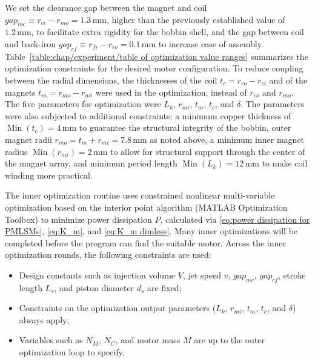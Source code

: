     
    We set the clearance gap between the magnet and coil $gap_{mc}\equiv r_{ci}-r_{mo} = 1.3\,\mathrm{mm}$, higher than the previously established value of $1.2\,\mathrm{mm}$,  to facilitate extra rigidity for the bobbin shell, and the gap between coil and back-iron $gap_{cf}\equiv r_{fi}-r_{co} = 0.1\,\mathrm{mm}$ to increase ease of assembly. Table~\ref{table:chap/experiment/table of optimization value ranges} summarizes the optimization constraints for the desired motor configuration. To reduce coupling between the radial dimensions, the thicknesses of the coil $t_c = r_{co} - r_{ci}$ and of the magnets $t_m = r_{mo} - r_{mi}$ were used in the optimization, instead of $r_{co}$ and $r_{mo}$. The five parameters for optimization were $L_k$, $r_{mi}$, $t_m$, $t_c$, and $\delta$. The parameters were also subjected to additional constraints: a minimum copper thickness of $\operatorname{Min}(t_c) = 4\,\mathrm{mm}$ to guarantee the structural integrity of the bobbin, outer magnet radii $r_{mo} = t_m + r_{mi} = 7.8\,\mathrm{mm}$ as noted above, a minimum inner magnet radius $\operatorname{Min}(r_{mi} ) = 2\,\mathrm{mm}$ to allow for structural support through the center of the magnet array, and minimum period length $\operatorname{Min}(L_k) = 12\,\mathrm{mm}$ to make coil winding more practical. 
    
    
    The inner optimization routine uses constrained nonlinear multi-variable optimization based on the interior point algorithm (MATLAB Optimization Toolbox) to minimize power dissipation $P$, calculated via \eqref{eq:power dissipation for PMLSMs}, \eqref{eq:K_m}, and \eqref{eq:K_m dimless}. Many inner optimizations will be completed before the program can find the suitable motor. Across the inner optimization rounds, the following constraints are used: 
    
    
    \begin{itemize}
    \item Design constants such as injection volume $V$, jet speed $v$, $gap_{mc}$, $gap_{cf}$, stroke length $L_s$, and piston diameter $d_s$ are fixed;
    \item Constraints on the optimization output parameters ($L_k$, $r_{mi}$, $t_m$, $t_c$, and $\delta$) always apply;
    \item Variables such as $N_M$, $N_C$, and motor mass $M$ are up to the outer optimization loop to specify.
    \end{itemize}
    
